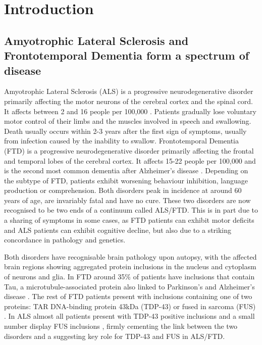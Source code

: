 
\chapter{Introduction}

\section{Amyotrophic Lateral Sclerosis and Frontotemporal Dementia form a spectrum of disease} %

Amyotrophic Lateral Sclerosis (ALS) is a progressive neurodegenerative disorder primarily affecting the motor neurons of the cerebral cortex and the spinal cord. It affects between 2 and 16 people per 100,000 \citep{Logroscino2010}. 
Patients gradually lose voluntary motor control of their limbs and the muscles involved in speech and swallowing. 
Death usually occurs within 2-3 years after the first sign of symptoms, usually from infection caused by the inability to swallow. 
Frontotemporal Dementia (FTD) is a progressive neurodegenerative disorder primarily affecting the frontal and temporal lobes of the cerebral cortex. 
It affects 15-22 people per 100,000 and is the second most common dementia after Alzheimer's disease \citep{Onyike2013}. 
Depending on the subtype of FTD, patients exhibit worsening behaviour inhibition, language production or comprehension. 
Both disorders peak in incidence at around 60 years of age, are invariably fatal and have no cure. 
These two disorders are now recognised to be two ends of a continuum called ALS/FTD. This is in part due to a sharing of symptoms in some cases, as FTD patients can exhibit motor deficits and ALS patients can exhibit cognitive decline, but also due to a striking concordance in pathology and genetics.  %

Both disorders have recognisable brain pathology upon autopsy, with the affected brain regions showing aggregated protein inclusions in the nucleus and cytoplasm of neurons and glia. In FTD around 35\% of patients have inclusions that contain Tau, a microtubule-associated protein also linked to Parkinson's and Alzheimer's disease \citep{Rademakers2004}. The rest of FTD patients present with inclusions containing one of two proteins: TAR DNA-binding protein 43kDa (TDP-43) \citep{Neumann2006, Arai2006} or fused in sarcoma (FUS) \citep{Neumann2009}. In ALS almost all patients present with TDP-43 positive inclusions \citep{Neumann2006, Arai2006} and a small number display FUS inclusions \citep{Vance2009-ye,Kwiatkowski2009}, firmly cementing the link between the two disorders and a suggesting key role for TDP-43 and FUS in ALS/FTD.

